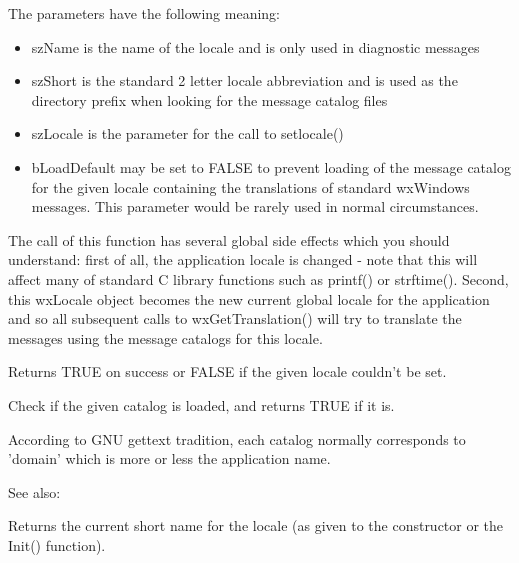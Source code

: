 \label{wxlocaleinit}


The parameters have the following meaning:

\begin{itemize}\itemsep=0pt
\item szName is the name of the locale and is only used in diagnostic messages
\item szShort is the standard 2 letter locale abbreviation and is used as the
directory prefix when looking for the message catalog files
\item szLocale is the parameter for the call to setlocale()
\item bLoadDefault may be set to FALSE to prevent loading of the message catalog
for the given locale containing the translations of standard wxWindows messages.
This parameter would be rarely used in normal circumstances.
\end{itemize}

The call of this function has several global side effects which you should
understand: first of all, the application locale is changed - note that this
will affect many of standard C library functions such as printf() or strftime().
Second, this wxLocale object becomes the new current global locale for the
application and so all subsequent calls to wxGetTranslation() will try to
translate the messages using the message catalogs for this locale.

Returns TRUE on success or FALSE if the given locale couldn't be set.

\label{wxlocaleisloaded}


Check if the given catalog is loaded, and returns TRUE if it is.

According to GNU gettext tradition, each catalog
normally corresponds to 'domain' which is more or less the application name.

See also: 

\label{wxlocalegetname}


Returns the current short name for the locale (as given to the constructor or
the Init() function).

